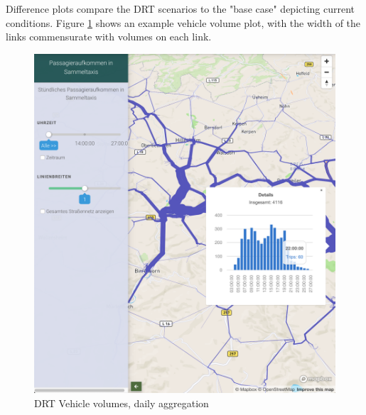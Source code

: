Difference plots compare the DRT scenarios to the "base case" depicting current conditions. Figure \ref{fig:avov-vehicles-daily} shows an example vehicle volume plot, with the width of the links commensurate with volumes on each link.

\begin{figure}[ht]
  \centering
  \begin{minipage}[c]{0.45\textwidth}
     \includegraphics[width=\linewidth]{chapters/22-avov/images/fig-link-vols.png}
     \caption{DRT Vehicle volumes, daily aggregation }
     \label{fig:avov-vehicles-daily}
  \end{minipage}
  \begin{minipage}[c]{0.45\textwidth}

\end{minipage}
\end{figure}

